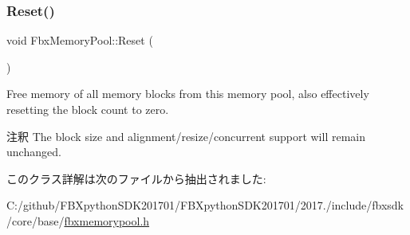 \subsubsection{\texorpdfstring{Reset()}{Reset()}}
{\footnotesize\ttfamily void Fbx\+Memory\+Pool\+::\+Reset (\begin{DoxyParamCaption}{ }\end{DoxyParamCaption})}

Free memory of all memory blocks from this memory pool, also effectively resetting the block count to zero. \begin{DoxyRemark}{注釈}
The block size and alignment/resize/concurrent support will remain unchanged. 
\end{DoxyRemark}


このクラス詳解は次のファイルから抽出されました\+:\begin{DoxyCompactItemize}
\item 
C\+:/github/\+F\+B\+Xpython\+S\+D\+K201701/\+F\+B\+Xpython\+S\+D\+K201701/2017./include/fbxsdk/core/base/\hyperlink{fbxmemorypool_8h}{fbxmemorypool.\+h}\end{DoxyCompactItemize}
